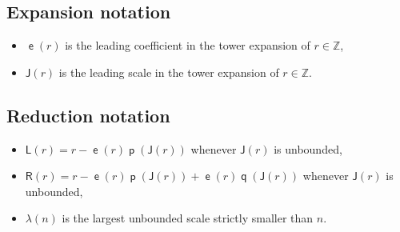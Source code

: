 \documentclass[10pt]{amsart}
\theoremstyle{definition}\newtheorem{defi}[theo]{Definition}\newtheorem{rema}[theo]{Remark}\newtheorem{exam}[theo]{Example}\newtheorem{exem}[theo]{Example}\newtheorem{nota}[theo]{Notation}
\DeclareMathOperator{\lst}{\mathsf{e}}
\DeclareMathOperator{\p}{\mathsf{p}}
\DeclareMathOperator{\q}{\mathsf{q}}
\newcommand{\Z}{\mathbb{Z}}
\newcommand{\lft}{\mathsf{L}}
\newcommand{\rht}{\mathsf{R}}
\newcommand{\scl}{\mathsf{J}}
\begin{document}
\subsection*{Expansion notation}
\begin{itemize}
\item $\lst(r)$ is the leading coefficient in the tower expansion of $r \in \Z$,
\item $\scl(r)$ is the leading scale in the tower expansion of $r \in \Z$.
\end{itemize}


\subsection*{Reduction notation}
\begin{itemize}
\item $\lft(r) = r - \lst(r) \p(\scl(r))$ whenever $\scl(r)$ is unbounded,
\item $\rht(r) = r - \lst(r) \p(\scl(r)) + \lst(r) \q(\scl(r))$ whenever $\scl(r)$ is unbounded,
\item $\lambda(n)$ is the largest unbounded scale strictly smaller than $n$.
\end{itemize}


\end{document}
